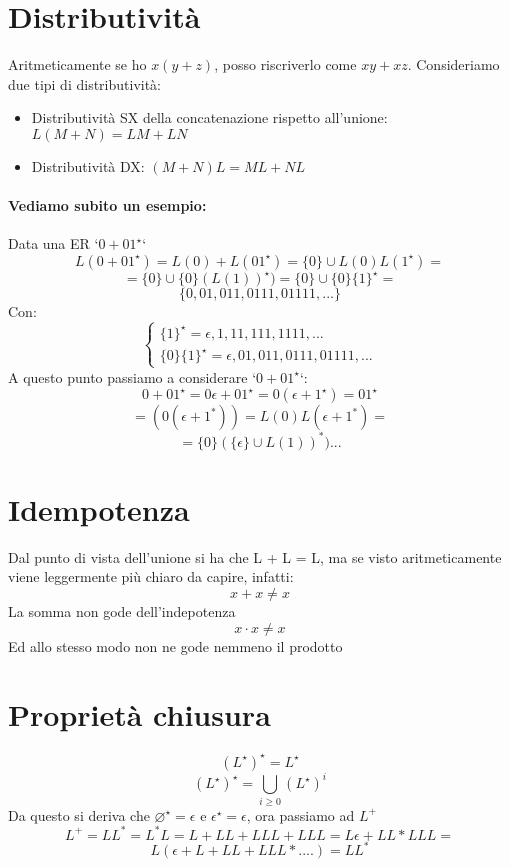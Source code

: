 \documentclass[12pt, a4paper, openany, oneside]{book}
\begin{document}
\section{Distributività}
Aritmeticamente se ho $x(y+z)$, posso riscriverlo come $xy+xz$.
Consideriamo due tipi di distributività:
\begin{itemize}
	\item Distributività SX della concatenazione rispetto all'unione: \\
	$L(M+N) = LM + LN$
	\item Distributività DX: $(M+N)L = ML + NL$
\end{itemize}
\paragraph{Vediamo subito un esempio: } Data una ER `$0+01^{\star}$`
\[
L(0+01^{\star}) = L(0) + L(01^{\star}) = \{0\} \cup L(0)L(1^{\star}) =
\]
\[
= \{0\} \cup \{0\} (L(1))^{\star}) = \{0\} \cup \{0\} \{1\}^{\star} = 
\]
\[
\{0,01,011,0111, 01111, ...\}
\]
Con:
\[
\begin{cases}
\{1\}^{\star} = \epsilon, 1, 11, 111, 1111, ... \\
\{0\} \{1\}^{\star} = \epsilon, 01, 011, 0111, 01111, ...
\end{cases}
\]
A questo punto passiamo a considerare `$0+01^{\star}$`:
\[
0+01^{\star} = 0\epsilon + 01^{\star} = 0(\epsilon + 1^{\star}) = 01^{\star}
\]
\[
= (0(\epsilon + 1^{*})) = L(0) L(\epsilon + 1^{*}) = 
\]
\[
= \{0\} (\{\epsilon\} \cup L(1))^{*}) ...
\]
\section{Idempotenza}
Dal punto di vista dell'unione si ha che L + L = L, ma se visto aritmeticamente
viene leggermente più chiaro da capire, infatti:
\[x+x\neq x\]
La somma non gode dell'indepotenza
\[x\cdot x\neq x\]
Ed allo stesso modo non ne gode nemmeno il prodotto
\section{Proprietà chiusura}
\[
(L^{\star})^{\star} = L^{\star}
\]
\[
(L^{\star})^{\star} = \bigcup \limits _{i \geq 0} {(L^{\star})^{i}}
\]
Da questo si deriva che $\varnothing^{\star}=\epsilon$ e $\epsilon^{\star}=\epsilon$,
ora passiamo ad $L^{+}$
\[
L^{+} = LL^{*} = L^{*}L = L + LL + LLL + LLL = L\epsilon + LL * LLL =
\]	
\[
L(\epsilon + L + LL + LLL * ....) = LL^{*}
\]	
\end{document}
